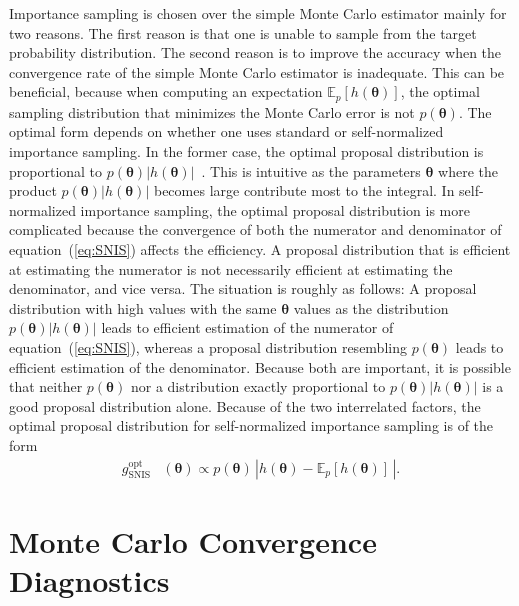 \documentclass[12pt]{article}
\newenvironment{nalign}{
    \begin{equation}
    \begin{aligned}
}{
    \end{aligned}
    \end{equation}
    \ignorespacesafterend
}
\begin{document}
Importance sampling is chosen over the simple Monte Carlo estimator mainly for two reasons.
The first reason is that one is unable to
sample from the target probability distribution.
The second reason is to improve the accuracy when
the convergence rate of the simple Monte Carlo estimator is inadequate.
This can be beneficial, because when computing an expectation
$\mathbb{E}_p [h(\boldsymbol{\theta})]$, the optimal
sampling distribution that minimizes the Monte Carlo error is not $p (\boldsymbol{\theta})$.
The optimal form depends on whether one uses standard or self-normalized importance sampling.
In the former case, the optimal proposal distribution is proportional to
$p (\boldsymbol{\theta}) |h(\boldsymbol{\theta})|$~\citep{kahn1953methods}.
%
%
%
%
%
This is intuitive as the parameters $\boldsymbol{\theta}$ where the product 
$p (\boldsymbol{\theta}) |h(\boldsymbol{\theta})|$
becomes large contribute most to the integral.
%
%
%
%
%
%
In self-normalized importance sampling, the optimal proposal
distribution is more complicated
because the convergence of both the numerator and denominator of equation~(\ref{eq:SNIS})
affects the efficiency.
%
A proposal distribution that is efficient at estimating the numerator 
is not necessarily efficient at estimating the denominator, and
vice versa.
The situation is roughly as follows:
A proposal distribution with high values with the same $\boldsymbol{\theta}$ values as the distribution $p (\boldsymbol{\theta}) | h(\boldsymbol{\theta}) | $ leads to efficient estimation of the numerator of equation~(\ref{eq:SNIS}), whereas
a proposal distribution resembling
$ p (\boldsymbol{\theta})$ leads to efficient estimation of the denominator.
Because both are important, it is possible that neither $p (\boldsymbol{\theta})$ nor a distribution exactly proportional to $p (\boldsymbol{\theta}) | h(\boldsymbol{\theta}) |$ is
a good proposal distribution alone.
Because of the two interrelated factors,
the optimal proposal distribution for self-normalized importance sampling is of the form~\citep{hesterberg1988advances}
\begin{nalign} \label{eq:snisopt}
g_{\text{SNIS}}^{\text{opt}} & (\boldsymbol{\theta})  \propto p (\boldsymbol{\theta}) \, |h(\boldsymbol{\theta}) - \mathbb{E}_p [h(\boldsymbol{\theta})]\, | .
%
%
%
%
%
%
\end{nalign}





%
%
\section{Monte Carlo Convergence Diagnostics} \label{sec:diagnost}
\end{document}
